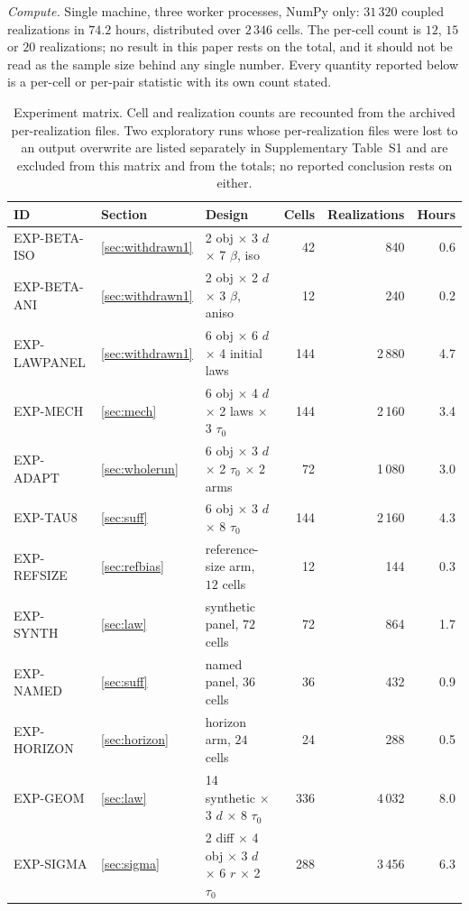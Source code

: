\documentclass[pdflatex,sn-mathphys-num]{sn-jnl}
\theoremstyle{thmstyleone}
\theoremstyle{thmstyletwo}
\theoremstyle{thmstylethree}
\begin{document}
\emph{Compute.} Single machine, three worker processes, NumPy only: $31\,320$ coupled realizations in $74.2$ hours, distributed over $2\,346$ cells. The per-cell count is $12$, $15$ or $20$ realizations; no result in this paper rests on the total, and it should not be read as the sample size behind any single number. Every quantity reported below is a per-cell or per-pair statistic with its own count stated.

\begin{table}[h]
\caption{Experiment matrix. Cell and realization counts are recounted from the archived per-realization files. Two exploratory runs whose per-realization files were lost to an output overwrite are listed separately in Supplementary Table~S1 and are excluded from this matrix and from the totals; no reported conclusion rests on either.}\label{tab:matrix}
\footnotesize\begin{tabular}{@{}llp{4.8cm}rrr@{}}
\toprule
ID & Section & Design & Cells & Realizations & Hours\\
\midrule
EXP-BETA-ISO & \ref{sec:withdrawn1} & 2 obj $\times$ 3 $d$ $\times$ 7 $\beta$, iso & 42 & 840 & 0.6\\
EXP-BETA-ANI & \ref{sec:withdrawn1} & 2 obj $\times$ 2 $d$ $\times$ 3 $\beta$, aniso & 12 & 240 & 0.2\\
EXP-LAWPANEL & \ref{sec:withdrawn1} & 6 obj $\times$ 6 $d$ $\times$ 4 initial laws & 144 & 2\,880 & 4.7\\
EXP-MECH & \ref{sec:mech} & 6 obj $\times$ 4 $d$ $\times$ 2 laws $\times$ 3 $\tau_0$ & 144 & 2\,160 & 3.4\\
EXP-ADAPT & \ref{sec:wholerun} & 6 obj $\times$ 3 $d$ $\times$ 2 $\tau_0$ $\times$ 2 arms & 72 & 1\,080 & 3.0\\
EXP-TAU8 & \ref{sec:suff} & 6 obj $\times$ 3 $d$ $\times$ 8 $\tau_0$ & 144 & 2\,160 & 4.3\\
EXP-REFSIZE & \ref{sec:refbias} & reference-size arm, $12$ cells & 12 & 144 & 0.3\\
EXP-SYNTH & \ref{sec:law} & synthetic panel, $72$ cells & 72 & 864 & 1.7\\
EXP-NAMED & \ref{sec:suff} & named panel, $36$ cells & 36 & 432 & 0.9\\
EXP-HORIZON & \ref{sec:horizon} & horizon arm, $24$ cells & 24 & 288 & 0.5\\
EXP-GEOM & \ref{sec:law} & 14 synthetic $\times$ 3 $d$ $\times$ 8 $\tau_0$ & 336 & 4\,032 & 8.0\\
EXP-SIGMA & \ref{sec:sigma} & 2 diff $\times$ 4 obj $\times$ 3 $d$ $\times$ 6 $r$ $\times$ 2 $\tau_0$ & 288 & 3\,456 & 6.3\\

\end{tabular}
\end{table}
\end{document}
